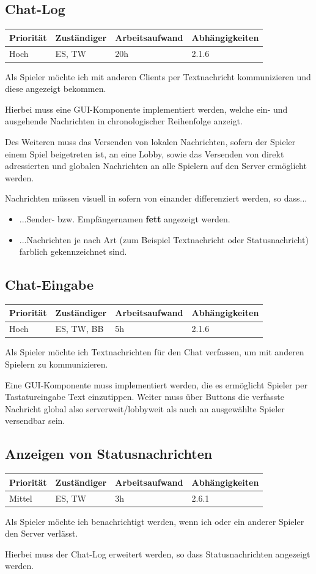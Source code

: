 \documentclass[a4paper]{scrreprt}
\newenvironment{requirement}[5] {
	\subsection{#1}
	\begin{tabularx}{\textwidth}{|X|l|X|X|}
		\hline
		Priorität & Zuständiger & Arbeitsaufwand & Abhängigkeiten \\
		\hline
		#2 & #3 & #4 & #5 \\
		\hline
	\end{tabularx}
	}{
	\newpage
	}
\begin{document}
\begin{requirement}{Chat-Log}{Hoch}{ES, TW}{20h}{2.1.6}

\begin{center}
Als Spieler möchte ich mit anderen Clients per Textnachricht kommunizieren und diese angezeigt bekommen.
\end{center}

Hierbei muss eine GUI-Komponente implementiert werden, welche ein- und ausgehende Nachrichten in chronologischer Reihenfolge anzeigt.

Des Weiteren muss das Versenden von lokalen Nachrichten, sofern der Spieler einem Spiel beigetreten ist, an eine Lobby, sowie das Versenden von direkt adressierten und \glqq globalen\grqq{} Nachrichten an alle Spielern auf den Server ermöglicht werden.

Nachrichten müssen visuell in sofern von einander differenziert werden, so dass...
\begin{itemize}
	\item ...Sender- bzw. Empfängernamen \textbf{fett} angezeigt werden.
	\item ...Nachrichten je nach Art (zum Beispiel Textnachricht oder Statusnachricht) farblich gekennzeichnet sind.
\end{itemize}
\end{requirement}


\begin{requirement}{Chat-Eingabe}{Hoch}{ES, TW, BB}{5h}{2.1.6}

\begin{center}
	Als Spieler möchte ich Textnachrichten für den Chat verfassen, um mit anderen Spielern zu kommunizieren.
\end{center}

Eine GUI-Komponente muss implementiert werden, die es ermöglicht Spieler per Tastatureingabe Text einzutippen. Weiter muss über Buttons die verfasste Nachricht \glqq global\grqq{} also serverweit/lobbyweit als auch an ausgewählte Spieler versendbar sein.

\end{requirement}


\begin{requirement}{Anzeigen von Statusnachrichten}{Mittel}{ES, TW}{3h}{2.6.1}

\begin{center}
	Als Spieler möchte ich benachrichtigt werden, wenn ich oder ein anderer Spieler den Server verlässt.
\end{center}

Hierbei muss der Chat-Log erweitert werden, so dass Statusnachrichten angezeigt werden.

\end{requirement}
\end{document}
